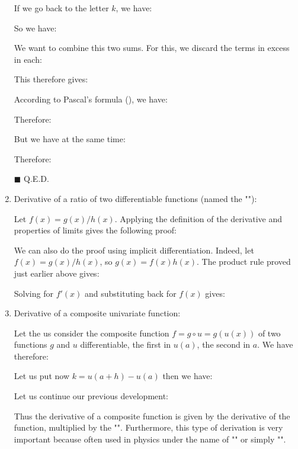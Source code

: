 \begin{enumerate}
\begin{dem}
		 	If we go back to the letter $k$, we have:
		 	
		 	So we have:
		 	
		 	We want to combine this two sums. For this, we discard the terms in excess in each:
		 	
		 	This therefore gives:
		 	
		 	According to Pascal's formula (), we have:
		 	
		 	Therefore:
		 	
		 	But we have at the same time:
		 	
		 	Therefore:
		 	
		 	\begin{flushright}
				$\blacksquare$  Q.E.D.
			\end{flushright}
		 \end{dem}
		 
		 \item Derivative of a ratio of two differentiable functions (named the "\label{quotient rule}"):
		 
		 Let $f(x)=g(x)/h(x)$. Applying the definition of the derivative and properties of limits gives the following proof:
		 
		 We can also do the proof using implicit differentiation. Indeed, let $f(x)=g(x)/h(x)$, so $g(x)=f(x)h(x)$. The product rule proved just earlier above gives:
		
		Solving for $f'(x)$ and substituting back for $f(x)$ gives:
		
		 
		 \item Derivative of a composite univariate function:
		 
		 Let the us consider the composite function $f=g \circ u=g(u(x))$ of two functions $g$ and $u$ differentiable, the first in $u (a)$, the second in $a$. We have therefore:
		 
		 Let us put now $k=u(a+h)-u(a)$ then we have:
		  
		 Let us continue our previous development:
		  
		 Thus the derivative of a composite function is given by the derivative of the function, multiplied by the "". Furthermore, this type of derivation is very important because often used in physics under the name of "" or simply "".
		 

\end{enumerate}
